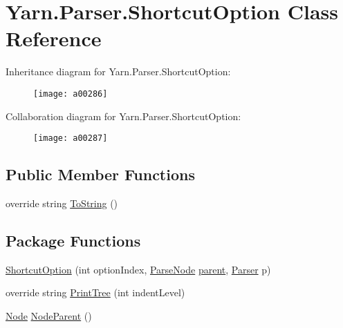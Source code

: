 \hypertarget{a00070}{\section{Yarn.\-Parser.\-Shortcut\-Option Class Reference}
\label{a00070}
}


Inheritance diagram for Yarn.\-Parser.\-Shortcut\-Option\-:
\nopagebreak
\begin{figure}[H]
\begin{center}
\leavevmode
\texttt{[image: a00286]}
\end{center}
\end{figure}


Collaboration diagram for Yarn.\-Parser.\-Shortcut\-Option\-:
\nopagebreak
\begin{figure}[H]
\begin{center}
\leavevmode
\texttt{[image: a00287]}
\end{center}
\end{figure}
\subsection*{Public Member Functions}
\begin{DoxyCompactItemize}
\item 
override string \hyperlink{a00063_a18c67cb16090d0889bb9d6c8c6c565f8}{To\-String} ()
\end{DoxyCompactItemize}
\subsection*{Package Functions}
\begin{DoxyCompactItemize}
\item 
\hyperlink{a00070_a2c80b137d65f31b24533987233074605}{Shortcut\-Option} (int option\-Index, \hyperlink{a00063}{Parse\-Node} \hyperlink{a00063_af313a82103fcc2ff5a177dbb06b92f7b}{parent}, \hyperlink{a00064}{Parser} p)
\item 
override string \hyperlink{a00070_a529a2ef1aa6d7226db4ea7f3ea92b8c2}{Print\-Tree} (int indent\-Level)
\item 
\hyperlink{a00054}{Node} \hyperlink{a00063_a580e520a29444fc23ac3660cbe514a09}{Node\-Parent} ()
\end{DoxyCompactItemize}
